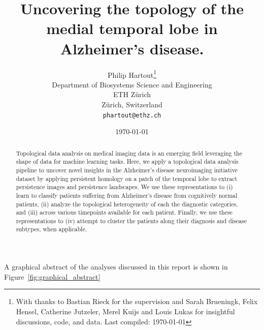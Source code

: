 \documentclass{article}
\title{Uncovering the topology of the medial temporal lobe in Alzheimer's disease.}
\author{%
  Philip Hartout\thanks{With thanks to Bastian Rieck for the supervision and Sarah Brueningk, Felix Hensel, Catherine Jutzeler, Merel Kuijs and Louis Lukas for insightful discussions, code, and data. Last compiled: \today}\\
  Department of Biosystems Science and Engineering\\
  ETH Zürich\\
  Zürich, Switzerland \\
  \texttt{phartout@ethz.ch} \\
}
\date{\today}
\begin{document}
\maketitle

\begin{abstract}
Topological data analysis on medical imaging data is an emerging field leveraging the shape of data for machine learning tasks. Here, we apply a topological data analysis pipeline to uncover novel insights in the Alzheimer's disease neuroimaging initiative dataset by applying persistent homology on a patch of the temporal lobe to extract persistence images and persistence landscapes. We use these representations to (i) learn to classify patients suffering from Alzheimer's disease from cognitively normal patients, (ii) analyze the topological heterogeneity of each the diagnostic categories, and (iii) across various timepoints available for each patient. Finally, we use these representations to (iv) attempt to cluster the patients along their diagnosis and disease subtypes, when applicable.
\end{abstract}

A graphical abstract of the analyses discussed in this report is shown in Figure~\ref{fig:graphical_abstract}
\end{document}
